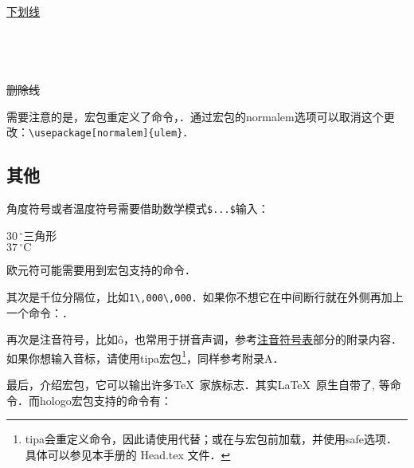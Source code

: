\begin{codeshow}
\uline{下划线} \\
 \\
 \\
 \\
 \\
\sout{删除线} \\
\end{codeshow}

需要注意的是，宏包重定义了命令，．通过宏包的normalem选项可以取消这个更改：\verb|\usepackage[normalem]{ulem}|．

\subsection{其他}
角度符号或者温度符号需要借助数学模式\verb|$...$|输入：

\begin{codeshow}
$30\,^{\circ}$三角形 \\
$37\,^{\circ}\mathrm{C}$
\end{codeshow}

欧元符可能需要用到宏包支持的命令．

其次是千位分隔位，比如\verb|1\,000\,000|．如果你不想它在中间断行就在外侧再加上一个命令：．

再次是注音符号，比如\^o，也常用于拼音声调，参考\hyperref[app:phonetic]{注音符号表}部分的附录内容．如果你想输入音标，请使用tipa宏包\footnote{tipa会重定义\latexline{!}命令，因此请使用代替；或在与宏包前加载，并使用safe选项．具体可以参见本手册的 Head.tex 文件．}，同样参考附录A．

最后，介绍宏包，它可以输出许多\TeX\ 家族标志．其实\LaTeX\ 原生自带了, 等命令．而hologo宏包支持的命令有：

\begin{codeshow}
 
\end{codeshow}

